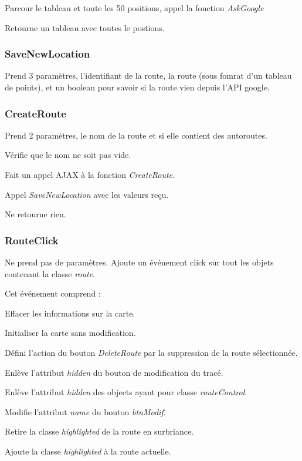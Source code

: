 \documentclass[a4paper]{article}
\newcommand{\diag}[1]{}
\begin{document}
Parcour le tableau et toute les 50 positions, appel la fonction \emph{AskGoogle}

Retourne un tableau avec toutes le postions.

\subsubsection{SaveNewLocation}
Prend 3 paramètres, l'identifiant de la route, la route (sous fomrat d'un tableau de points), et un boolean pour savoir si la route vien depuis l'API google.

\begin{center}
\diag{SaveNewRoute}
\end{center}

\subsubsection{CreateRoute}
Prend 2 paramètres, le nom de la route et si elle contient des autoroutes.

Vérifie que le nom ne soit pas vide.

Fait un appel AJAX à la fonction \emph{CreateRoute}.

Appel \emph{SaveNewLocation} avec les valeurs reçu.

Ne retourne rien.

\subsubsection{RouteClick}
Ne prend pas de paramètres.
Ajoute un événement click sur tout les objets contenant la classe \emph{route}.

Cet événement comprend :

Effacer les informations sur la carte.

Initialiser la carte sans modification.

Défini l'action du bouton \emph{DeleteRoute} par la suppression de la route sélectionnée.

Enlève l'attribut \emph{hidden} du bouton de modification du tracé.

Enlève l'attribut \emph{hidden} des objects ayant pour classe \emph{routeControl}.

Modifie l'attribut \emph{name} du bouton \emph{btnModif}.

Retire la classe \emph{highlighted} de la route en surbriance.

Ajoute la classe \emph{highlighted} à la route actuelle.
\end{document}

